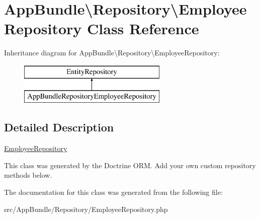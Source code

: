 \hypertarget{class_app_bundle_1_1_repository_1_1_employee_repository}{}\section{App\+Bundle\textbackslash{}Repository\textbackslash{}Employee\+Repository Class Reference}
\label{class_app_bundle_1_1_repository_1_1_employee_repository}
Inheritance diagram for App\+Bundle\textbackslash{}Repository\textbackslash{}Employee\+Repository\+:\begin{figure}[H]
\begin{center}
\leavevmode
\includegraphics[height=2.000000cm]{class_app_bundle_1_1_repository_1_1_employee_repository}
\end{center}
\end{figure}


\subsection{Detailed Description}
\mbox{\hyperlink{class_app_bundle_1_1_repository_1_1_employee_repository}{Employee\+Repository}}

This class was generated by the Doctrine O\+RM. Add your own custom repository methods below. 

The documentation for this class was generated from the following file\+:\begin{DoxyCompactItemize}
\item 
src/\+App\+Bundle/\+Repository/Employee\+Repository.\+php\end{DoxyCompactItemize}
